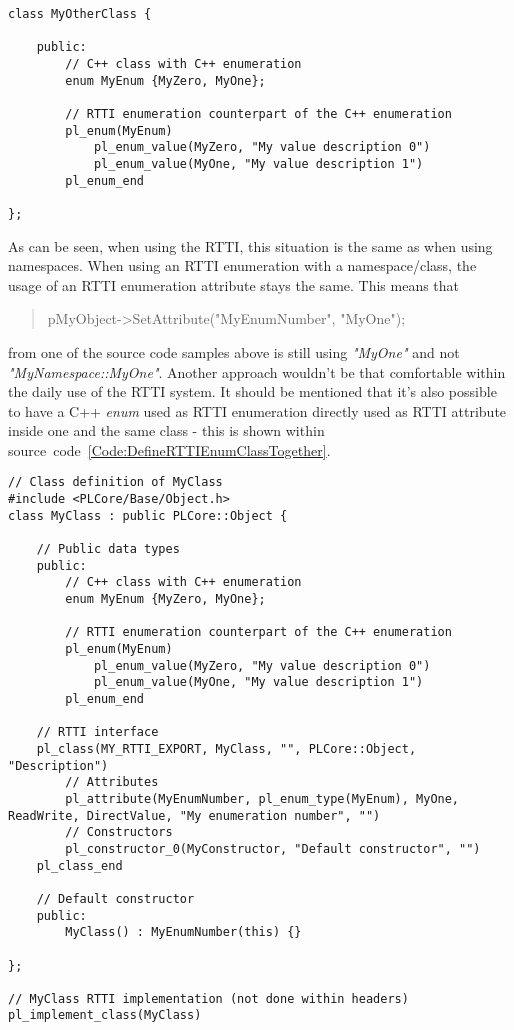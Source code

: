 \begin{lstlisting}[label=Code:DefineRTTIEnumClass,caption={Defining a new \ac{RTTI} enumeration using a C++ enum inside a class}]
class MyOtherClass {

	public:
		// C++ class with C++ enumeration
		enum MyEnum {MyZero, MyOne};

		// RTTI enumeration counterpart of the C++ enumeration
		pl_enum(MyEnum)
			pl_enum_value(MyZero, "My value description 0")
			pl_enum_value(MyOne, "My value description 1")
		pl_enum_end

};
\end{lstlisting}
As can be seen, when using the \ac{RTTI}, this situation is the same as when using namespaces. When using an \ac{RTTI} enumeration with a namespace/class, the usage of an \ac{RTTI} enumeration attribute stays the same. This means that \begin{quote}pMyObject->SetAttribute("MyEnumNumber", "MyOne");\end{quote} from one of the source code samples above is still using \emph{"MyOne"} and not \emph{"MyNamespace::MyOne"}. Another approach wouldn't be that comfortable within the daily use of the \ac{RTTI} system. It should be mentioned that it's also possible to have a C++ \emph{enum} used as \ac{RTTI} enumeration directly used as \ac{RTTI} attribute inside one and the same class - this is shown within source~code~\ref{Code:DefineRTTIEnumClassTogether}.
\begin{lstlisting}[label=Code:DefineRTTIEnumClassTogether,caption={Defining and using a new \ac{RTTI} enumeration inside one and the same class}]
// Class definition of MyClass
#include <PLCore/Base/Object.h>
class MyClass : public PLCore::Object {

	// Public data types
	public:
		// C++ class with C++ enumeration
		enum MyEnum {MyZero, MyOne};

		// RTTI enumeration counterpart of the C++ enumeration
		pl_enum(MyEnum)
			pl_enum_value(MyZero, "My value description 0")
			pl_enum_value(MyOne, "My value description 1")
		pl_enum_end

	// RTTI interface
	pl_class(MY_RTTI_EXPORT, MyClass, "", PLCore::Object, "Description")
		// Attributes
		pl_attribute(MyEnumNumber, pl_enum_type(MyEnum), MyOne, ReadWrite, DirectValue, "My enumeration number", "")
		// Constructors
		pl_constructor_0(MyConstructor, "Default constructor", "")
	pl_class_end

	// Default constructor
	public:
		MyClass() : MyEnumNumber(this) {}

};

// MyClass RTTI implementation (not done within headers)
pl_implement_class(MyClass)
\end{lstlisting}


